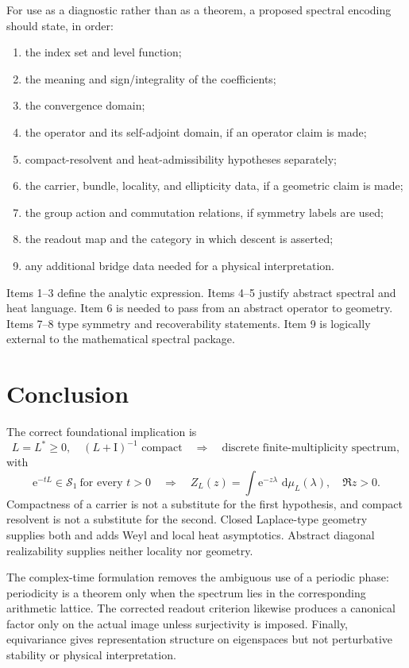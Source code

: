 \documentclass[11pt,a4paper]{article}
\theoremstyle{definition}
\theoremstyle{remark}
\newcommand{\Scal}{\mathcal S}
\newcommand{\Id}{\mathrm I}
\newcommand{\e}{\mathrm e}
\newcommand{\dd}{\,\mathrm d}
\begin{document}
For use as a diagnostic rather than as a theorem, a proposed spectral encoding
should state, in order:
\begin{enumerate}
\item the index set and level function;
\item the meaning and sign/integrality of the coefficients;
\item the convergence domain;
\item the operator and its self-adjoint domain, if an operator claim is made;
\item compact-resolvent and heat-admissibility hypotheses separately;
\item the carrier, bundle, locality, and ellipticity data, if a geometric claim
      is made;
\item the group action and commutation relations, if symmetry labels are used;
\item the readout map and the category in which descent is asserted;
\item any additional bridge data needed for a physical interpretation.
\end{enumerate}

Items 1--3 define the analytic expression. Items 4--5 justify abstract spectral
and heat language. Item 6 is needed to pass from an abstract operator to
geometry. Items 7--8 type symmetry and recoverability statements. Item 9 is
logically external to the mathematical spectral package.

\section{Conclusion}

The correct foundational implication is
\[
\boxed{
L=L^*\geq0,\quad (L+\Id)^{-1}\text{ compact}
\quad\Longrightarrow\quad
\text{discrete finite-multiplicity spectrum},
}
\]
with
\[
\boxed{
\e^{-tL}\in\Scal_1\ \text{for every }t>0
\quad\Longrightarrow\quad
Z_L(z)=\int\e^{-z\lambda}\,\dd\mu_L(\lambda),\quad\Re z>0.
}
\]
Compactness of a carrier is not a substitute for the first hypothesis, and
compact resolvent is not a substitute for the second. Closed Laplace-type
geometry supplies both and adds Weyl and local heat asymptotics. Abstract
diagonal realizability supplies neither locality nor geometry.

The complex-time formulation removes the ambiguous use of a periodic phase:
periodicity is a theorem only when the spectrum lies in the corresponding
arithmetic lattice. The corrected readout criterion likewise produces a
canonical factor only on the actual image unless surjectivity is imposed.
Finally, equivariance gives representation structure on eigenspaces but not
perturbative stability or physical interpretation.
\end{document}
